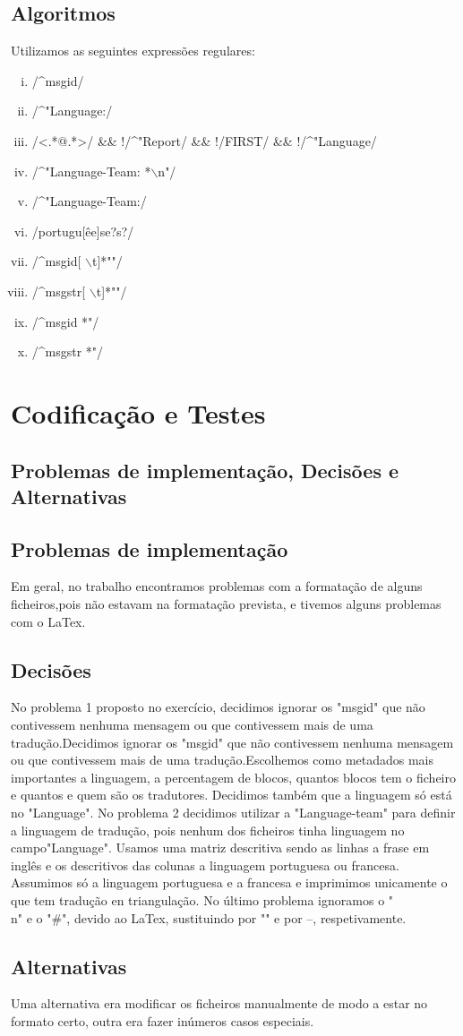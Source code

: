 \documentclass{report}
\def\titulo#1{\section{#1}}
\begin{document}
\section{Algoritmos}
Utilizamos as seguintes expressões regulares:
\begin{enumerate}[i)]
\item /\^{}msgid/
\item /\^{}"Language:/
\item /\textless.*@.*\textgreater/ \&\& !/\^{}"Report/ \&\& !/FIRST/ \&\& !/\^{}"Language/
\item /\^{}"Language-Team: *$\backslash$n"/
\item /\^{}"Language-Team:/
\item /portugu[êe]se?s?/
\item /\^{}msgid[ $\backslash$t]*""/
\item /\^{}msgstr[ $\backslash$t]*""/
\item /\^{}msgid *"/
\item /\^{}msgstr *"/
\end{enumerate}




\chapter{Codificação e Testes}
\section{Problemas de implementação, Decisões e Alternativas}
\titulo{Problemas de implementação}
Em geral, no trabalho encontramos problemas com a formatação de alguns ficheiros,pois não estavam na formatação prevista, e tivemos alguns problemas com o LaTex.
\titulo{Decisões}
No problema 1 proposto no exercício, decidimos ignorar os "msgid" que não contivessem nenhuma mensagem ou que contivessem mais de uma tradução.Decidimos ignorar os "msgid" que não contivessem nenhuma mensagem ou que contivessem mais de uma tradução.Escolhemos como metadados mais importantes a linguagem, a percentagem de blocos, quantos blocos tem o ficheiro e quantos e quem são os tradutores. Decidimos também que a linguagem só está no "Language".
No problema 2 decidimos utilizar a "Language-team" para definir a linguagem de tradução, pois nenhum dos ficheiros tinha linguagem no campo"Language". Usamos uma matriz descritiva sendo as linhas a frase em inglês e os descritivos das colunas a linguagem portuguesa ou francesa. Assumimos só a linguagem portuguesa e a francesa e imprimimos unicamente o que tem tradução en triangulação.
No último problema ignoramos o "\\n" e o "\#", devido ao LaTex, sustituindo por "" e por --, respetivamente.
\titulo{Alternativas}
Uma alternativa era modificar os ficheiros manualmente de modo a estar no formato certo, outra era fazer inúmeros casos especiais.
\end{document}

